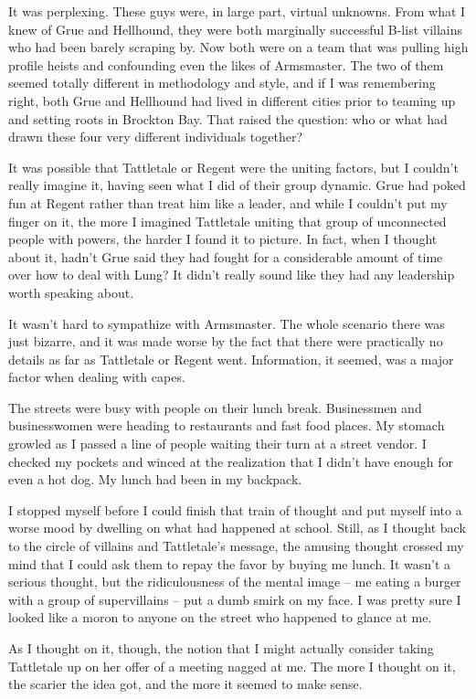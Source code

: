 It was perplexing. These guys were, in large part, virtual unknowns. From what I knew of Grue and Hellhound, they were both marginally successful B-list villains who had been barely scraping by. Now both were on a team that was pulling high profile heists and confounding even the likes of Armsmaster. The two of them seemed totally different in methodology and style, and if I was remembering right, both Grue and Hellhound had lived in different cities prior to teaming up and setting roots in Brockton Bay. That raised the question: who or what had drawn these four very different individuals together?

It was possible that Tattletale or Regent were the uniting factors, but I couldn't really imagine it, having seen what I did of their group dynamic. Grue had poked fun at Regent rather than treat him like a leader, and while I couldn't put my finger on it, the more I imagined Tattletale uniting that group of unconnected people with powers, the harder I found it to picture. In fact, when I thought about it, hadn't Grue said they had fought for a considerable amount of time over how to deal with Lung? It didn't really sound like they had any leadership worth speaking about.

It wasn't hard to sympathize with Armsmaster. The whole scenario there was just bizarre, and it was made worse by the fact that there were practically no details as far as Tattletale or Regent went. Information, it seemed, was a major factor when dealing with capes.

The streets were busy with people on their lunch break. Businessmen and businesswomen were heading to restaurants and fast food places. My stomach growled as I passed a line of people waiting their turn at a street vendor. I checked my pockets and winced at the realization that I didn't have enough for even a hot dog. My lunch had been in my backpack.

I stopped myself before I could finish that train of thought and put myself into a worse mood by dwelling on what had happened at school. Still, as I thought back to the circle of villains and Tattletale's message, the amusing thought crossed my mind that I could ask them to repay the favor by buying me lunch. It wasn't a serious thought, but the ridiculousness of the mental image -- me eating a burger with a group of supervillains -- put a dumb smirk on my face. I was pretty sure I looked like a moron to anyone on the street who happened to glance at me.

As I thought on it, though, the notion that I might actually consider taking Tattletale up on her offer of a meeting nagged at me. The more I thought on it, the scarier the idea got, and the more it seemed to make sense.

